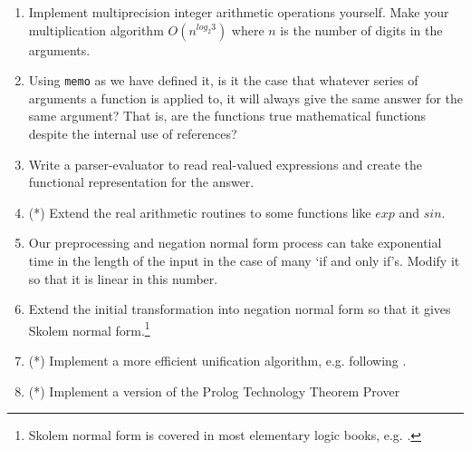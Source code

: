 \begin{enumerate}
\item Implement multiprecision integer arithmetic operations yourself. Make
your multiplication algorithm $O(n^{log_2 3})$ where $n$ is the number of
digits in the arguments.

\item Using {\tt memo} as we have defined it, is it the case that whatever
series of arguments a function is applied to, it will always give the same
answer for the same argument? That is, are the functions true mathematical
functions despite the internal use of references?

\item Write a parser-evaluator to read real-valued expressions and create the
functional representation for the answer.

\item (*) Extend the real arithmetic routines to some functions like $exp$ and
$sin$.

\item Our preprocessing and negation normal form process can take exponential
time in the length of the input in the case of many `if and only if's. Modify
it so that it is linear in this number.

\item Extend the initial transformation into negation normal form so that it
gives Skolem normal form.\footnote{Skolem normal form is covered in most
elementary logic books, e.g. .}

\item (*) Implement a more efficient unification algorithm, e.g. following
.

\item (*) Implement a version of the Prolog Technology Theorem Prover
\cite{stickel-pttp}

\end{enumerate}

